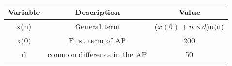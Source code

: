 \begin{tabular}{|c|c|c|}
    \hline
    \textbf{Variable} & \textbf{Description} & \textbf{Value} \\
    \hline
    x(n) & General term & ($x(0)+n\times d$)u(n)\\
    \hline
    x(0) & First term of AP & 200\\
    \hline
    d & common difference in the AP & 50\\
    \hline
\end{tabular}
